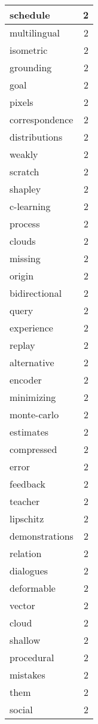 \begin{table}[h]
\begin{tabular}{|l|r|}
\hline
schedule & 2 \\
\hline
multilingual & 2 \\
\hline
isometric & 2 \\
\hline
grounding & 2 \\
\hline
goal & 2 \\
\hline
pixels & 2 \\
\hline
correspondence & 2 \\
\hline
distributions & 2 \\
\hline
weakly & 2 \\
\hline
scratch & 2 \\
\hline
shapley & 2 \\
\hline
c-learning & 2 \\
\hline
process & 2 \\
\hline
clouds & 2 \\
\hline
missing & 2 \\
\hline
origin & 2 \\
\hline
bidirectional & 2 \\
\hline
query & 2 \\
\hline
experience & 2 \\
\hline
replay & 2 \\
\hline
alternative & 2 \\
\hline
encoder & 2 \\
\hline
minimizing & 2 \\
\hline
monte-carlo & 2 \\
\hline
estimates & 2 \\
\hline
compressed & 2 \\
\hline
error & 2 \\
\hline
feedback & 2 \\
\hline
teacher & 2 \\
\hline
lipschitz & 2 \\
\hline
demonstrations & 2 \\
\hline
relation & 2 \\
\hline
dialogues & 2 \\
\hline
deformable & 2 \\
\hline
vector & 2 \\
\hline
cloud & 2 \\
\hline
shallow & 2 \\
\hline
procedural & 2 \\
\hline
mistakes & 2 \\
\hline
them & 2 \\
\hline
social & 2 \\
\hline

\end{tabular}
\end{table}
